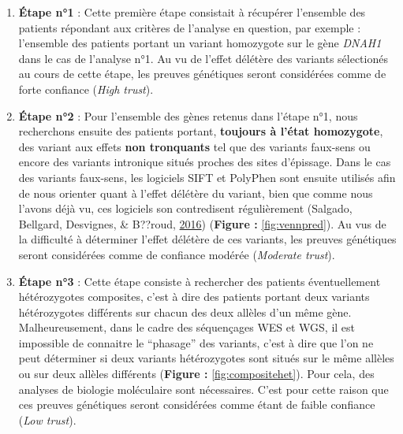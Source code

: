\documentclass[12pt,twoside]{reedthesis}
\theoremstyle{definition}
\theoremstyle{definition}
\theoremstyle{remark}
\begin{document}
  \begin{enumerate}
  \def\labelenumi{\arabic{enumi}.}
  \item
    \textbf{Étape n°1} : Cette première étape consistait à récupérer
    l'ensemble des patients répondant aux critères de l'analyse en
    question, par exemple : l'ensemble des patients portant un variant
    homozygote sur le gène \emph{DNAH1} dans le cas de l'analyse n°1. Au
    vu de l'effet délétère des variants sélectionés au cours de cette
    étape, les preuves génétiques seront considérées comme de forte
    confiance (\emph{High trust}).
  \item
    \textbf{Étape n°2} : Pour l'ensemble des gènes retenus dans l'étape
    n°1, nous recherchons ensuite des patients portant, \textbf{toujours à
    l'état homozygote}, des variant aux effets \textbf{non tronquants} tel
    que des variants faux-sens ou encore des variants intronique situés
    proches des sites d'épissage. Dans le cas des variants faux-sens, les
    logiciels SIFT et PolyPhen sont ensuite utilisés afin de nous orienter
    quant à l'effet délétère du variant, bien que comme nous l'avons déjà
    vu, ces logiciels son contredisent régulièrement (Salgado, Bellgard,
    Desvignes, \& B??roud, \protect\hyperlink{ref-Salgado2016}{2016})
    (\textbf{Figure :} \ref{fig:vennpred}). Au vus de la difficulté à
    déterminer l'effet délétère de ces variants, les preuves génétiques
    seront considérées comme de confiance modérée (\emph{Moderate trust}).
  \item
    \textbf{Étape n°3} : Cette étape consiste à rechercher des patients
    éventuellement hétérozygotes composites, c'est à dire des patients
    portant deux variants hétérozygotes différents sur chacun des deux
    allèles d'un même gène. Malheureusement, dans le cadre des séquençages
    WES et WGS, il est impossible de connaitre le ``phasage'' des
    variants, c'est à dire que l'on ne peut déterminer si deux variants
    hétérozygotes sont situés sur le même allèles ou sur deux allèles
    différents (\textbf{Figure : }\ref{fig:compositehet}). Pour cela, des
    analyses de biologie moléculaire sont nécessaires. C'est pour cette
    raison que ces preuves génétiques seront considérées comme étant de
    faible confiance (\emph{Low trust}).
  \end{enumerate}
  
\end{document}
